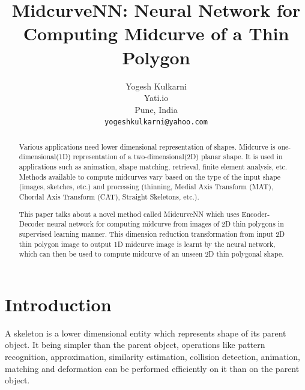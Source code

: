\documentclass[10pt,twocolumn,letterpaper]{article}
\begin{document}
\title{MidcurveNN: Neural Network for Computing Midcurve of a Thin Polygon}

\author{Yogesh Kulkarni\\
Yati.io\\
Pune, India\\
{\tt\small yogeshkulkarni@yahoo.com}
}

\maketitle

\begin{abstract}
Various applications need lower dimensional representation of shapes. Midcurve is one-dimensional(1D) representation of a two-dimensional(2D) planar shape. It is used in applications such as animation, shape matching, retrieval, finite element analysis, etc. Methods available to compute midcurves vary based on the type of the input shape (images, sketches, etc.) and processing (thinning, Medial Axis Transform (MAT), Chordal Axis Transform (CAT), Straight Skeletons, etc.).

This paper talks about a novel method called MidcurveNN which uses Encoder-Decoder neural network for computing midcurve from images of 2D thin polygons in supervised learning manner. This dimension reduction transformation from input 2D thin polygon image to output 1D midcurve image is learnt by the neural network, which can then be used to compute midcurve of an unseen 2D thin polygonal shape. 
\end{abstract}


\section{Introduction}
A skeleton is a lower dimensional entity which represents shape of its parent object. It being simpler than the parent object, operations like pattern recognition, approximation, similarity estimation, collision detection, animation, matching and deformation can be performed efficiently on it than on the parent object. 
\end{document}
